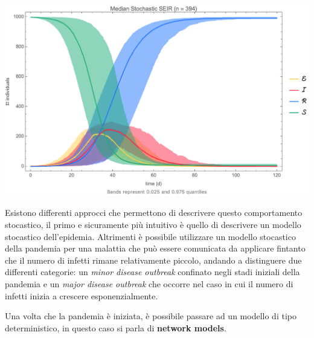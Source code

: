 \begin{minipage}{\linewidth}
    \centering
    \includegraphics[width=\textwidth]{img/stochastic_SEIR.png}
    \label{fig:stochastic_SEIR_model}
\end{minipage}

Esistono differenti approcci che permettono di descrivere questo comportamento stocastico, il primo e 
sicuramente più intuitivo è quello di descrivere un modello stocastico dell'epidemia. Altrimenti è possibile 
utilizzare un modello stocastico della pandemia per una malattia che può essere comunicata da applicare 
fintanto che il numero di infetti rimane relativamente piccolo, andando a distinguere due differenti categorie:
un \emph{minor disease outbreak} confinato negli stadi iniziali della pandemia e un 
\emph{major disease outbreak} che occorre nel caso in cui il numero di infetti inizia a crescere esponenzialmente.

Una volta che la pandemia è iniziata, è possibile passare ad un modello di tipo deterministico, in questo caso si 
parla di \textbf{network models}.